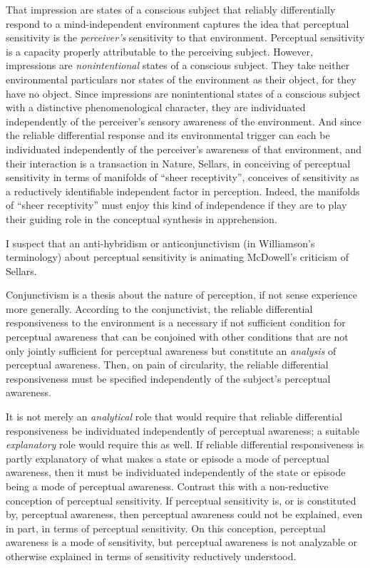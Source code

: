 \documentclass[12pt]{article}
\begin{document}
That impression are states of a conscious subject that reliably differentially respond to a mind-independent environment captures the idea that perceptual sensitivity is the \emph{perceiver's} sensitivity to that environment. Perceptual sensitivity is a capacity properly attributable to the perceiving subject. However, impressions are \emph{nonintentional} states of a conscious subject. They take neither environmental particulars nor states of the environment as their object, for they have no object. Since impressions are nonintentional states of a conscious subject with a distinctive phenomenological character, they are individuated independently of the perceiver's sensory awareness of the environment. And since the reliable differential response and its environmental trigger can each be individuated independently of the perceiver's awareness of that environment, and their interaction is a transaction in Nature, Sellars, in conceiving of perceptual sensitivity in terms of manifolds of ``sheer receptivity'', conceives of sensitivity as a reductively identifiable independent factor in perception. Indeed, the manifolds of ``sheer receptivity'' must enjoy this kind of independence if they are to play their guiding role in the conceptual synthesis in apprehension.

I suspect that an anti-hybridism or anticonjunctivism (in Williamson's \citeyear{Williamson:2000lr} terminology) about perceptual sensitivity is animating McDowell's criticism of Sellars. 

Conjunctivism is a thesis about the nature of perception, if not sense experience more generally. According to the conjunctivist, the reliable differential responsiveness to the environment is a necessary if not sufficient condition for perceptual awareness that can be conjoined with other conditions that are not only jointly sufficient for perceptual awareness but constitute an \emph{analysis} of perceptual awareness. Then, on pain of circularity, the reliable differential responsiveness must be specified independently of the subject's perceptual awareness. 

It is not merely an \emph{analytical} role that would require that reliable differential responsiveness be individuated independently of perceptual awareness; a suitable \emph{explanatory} role would require this as well. If reliable differential responsiveness is partly explanatory of what makes a state or episode a mode of perceptual awareness, then it must be individuated independently of the state or episode being a mode of perceptual awareness. Contrast this with a non-reductive conception of perceptual sensitivity. If perceptual sensitivity is, or is constituted by, perceptual awareness, then perceptual awareness could not be explained, even in part, in terms of perceptual sensitivity. On this conception, perceptual awareness is a mode of sensitivity, but perceptual awareness is not analyzable or otherwise explained in terms of sensitivity reductively understood. 
\end{document}
